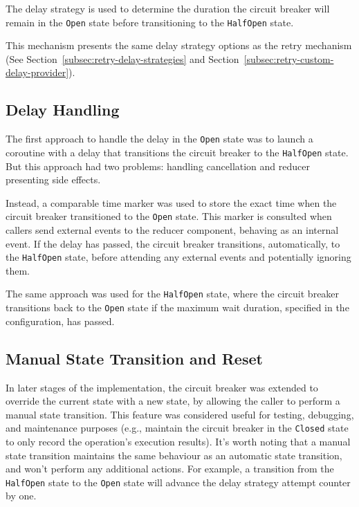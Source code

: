 The delay strategy is used
to determine the duration the circuit breaker will remain in the \texttt{Open} state before transitioning to the \texttt{HalfOpen} state.

This mechanism presents the same delay strategy options as the retry mechanism (See Section~\ref{subsec:retry-delay-strategies} and Section~\ref{subsec:retry-custom-delay-provider}).

\subsection{Delay Handling}\label{subsec:cbreaker-delay-handling}

The first approach to handle the delay in the \texttt{Open} state was
to launch a coroutine with a delay that transitions the circuit breaker to the \texttt{HalfOpen} state.
But this approach had two problems: handling cancellation and reducer presenting side effects.

Instead,
a comparable time marker was used to store the exact time when the circuit breaker transitioned to the \texttt{Open} state.
This marker is consulted when callers send external events to the reducer component,
behaving as an internal event.
If the delay has passed, the circuit breaker transitions, automatically, to the \texttt{HalfOpen} state,
before attending any external events and potentially ignoring them.

The same approach was used for the \texttt{HalfOpen} state,
where the circuit breaker transitions back to the \texttt{Open} state
if the maximum wait duration, specified in the configuration, has passed.

\subsection{Manual State Transition and Reset}\label{subsec:cbreaker-manual-state-transition}

In later stages of the implementation, the circuit breaker was extended to override the current state with a new state,
by allowing the caller to perform a manual state transition.
This feature was considered useful for testing, debugging,
and maintenance purposes (e.g., maintain the circuit breaker in the \texttt{Closed} state to only record the operation's execution results).
It's worth noting that a manual state transition maintains the same behaviour as an automatic state transition,
and won't perform any additional actions.
For example,
a transition from the \texttt{HalfOpen} state to the \texttt{Open} state will advance the delay strategy attempt counter by one.

